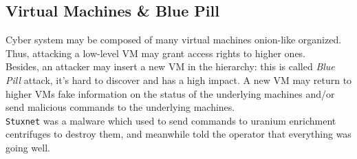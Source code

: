 \subsection*{Virtual Machines \& Blue Pill}
Cyber system may be composed of many virtual machines onion-like organized.
Thus, attacking a low-level VM may grant access rights to higher ones.\\
Besides, an attacker may insert a new VM in the hierarchy:
this is called \textit{Blue Pill} attack, it's hard to discover and has a high impact.
A new VM may return to higher VMs fake information on the status of the underlying machines and/or send malicious commands to the underlying machines.\\
\texttt{Stuxnet} was a malware which used to send commands to uranium enrichment centrifuges to destroy them, and meanwhile told the operator that everything was going well.  
